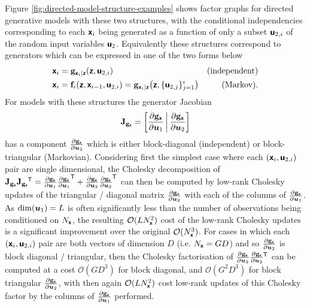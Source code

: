Figure \ref{fig:directed-model-structure-examples} shows factor graphs for directed generative models with these two structures, with the conditional independencies corresponding to each $\boldsymbol{\mathsf{x}}_i$ being generated as a function of only a subset $\boldsymbol{\mathsf{u}}_{2,i}$ of the random input variables $\boldsymbol{\mathsf{u}}_2$. Equivalently these structures correspond to generators which can be expressed in one of the two forms below
\begin{align}\label{eq:elem_autoreg_model_struct}
    \rvct{x}_i &= \genfunc_{\rvct{x}_i|\rvct{z}}(\rvct{z}, \rvct{u}_{2,i})
    & \text{(independent)}\\
    \rvct{x}_{i} 
    &=
    \vctfunc{f}_i\lpa\rvct{z}, \rvct{x}_{i-1}, \rvct{u}_{2,i}\rpa = 
    \genfunc_{\rvct{x}_i|\rvct{z}}\lpa\rvct{z}, \lbrace\rvct{u}_{2,j}\rbrace^i_{j=1}\rpa & \text{(Markov).}
\end{align}
For models with these structures the generator Jacobian
\begin{equation}
  \jacobian{\genfunc_{\rvct{x}}} =
  \lsb
   \pd{\genfunc_{\rvct{x}}}{\vct{u}_1} \,\middle|\,
   \pd{\genfunc_{\rvct{x}}}{\vct{u}_2}
  \rsb
\end{equation}
has a component $\frac{\partial {\mathbf{g}}_{\boldsymbol{\mathsf{x}}}}{\partial \boldsymbol{u}_2}$ which is either block-diagonal (independent) or block-triangular (Markovian). Considering first the simplest case where each $(\boldsymbol{\mathsf{x}}_i,\boldsymbol{\mathsf{u}}_{2,i})$ pair are single dimensional, the Cholesky decomposition of $\mathbf{J}_{{\mathbf{g}}_{\boldsymbol{\mathsf{x}}}}\mathbf{J}_{{\mathbf{g}}_{\boldsymbol{\mathsf{x}}}}\phantom{}^{\mkern-1.5mu\mathsf{T}} = \frac{\partial {\mathbf{g}}_{\boldsymbol{\mathsf{x}}}}{\partial \boldsymbol{u}_1}\frac{\partial {\mathbf{g}}_{\boldsymbol{\mathsf{x}}}}{\partial \boldsymbol{u}_1}^{\mkern-1.5mu\mathsf{T}} + \frac{\partial {\mathbf{g}}_{\boldsymbol{\mathsf{x}}}}{\partial \boldsymbol{u}_2} \frac{\partial {\mathbf{g}}_{\boldsymbol{\mathsf{x}}}}{\partial \boldsymbol{u}_2}^{\mkern-1.5mu\mathsf{T}}$ can then be computed by low-rank Cholesky updates of the triangular / diagonal matrix $\frac{\partial {\mathbf{g}}_{\boldsymbol{\mathsf{x}}}}{\partial \boldsymbol{u}_2}$ with each of the columns of $\frac{\partial {\mathbf{g}}_{\boldsymbol{\mathsf{x}}}}{\partial \boldsymbol{u}_1}$. As $\dim(\boldsymbol{u}_1) = L$ is often significantly less than the number of observations being conditioned on $N_{\boldsymbol{\mathsf{x}}}$, the resulting $\mathcal{O}(LN_{\boldsymbol{\mathsf{x}}}^2)$ cost of the low-rank Cholesky updates is a significant improvement over the original $\mathcal{O}(N_{\boldsymbol{\mathsf{x}}}^3)$. For cases in which each $(\boldsymbol{\mathsf{x}}_i,\boldsymbol{\mathsf{u}}_{2,i})$ pair are both vectors of dimension $D$ (i.e. $N_{\boldsymbol{\mathsf{x}}} = GD$) and so $\frac{\partial {\mathbf{g}}_{\boldsymbol{\mathsf{x}}}}{\partial \boldsymbol{u}_2}$ is block diagonal / triangular, then the Cholesky factorisation of  $\frac{\partial {\mathbf{g}}_{\boldsymbol{\mathsf{x}}}}{\partial \boldsymbol{u}_2} \frac{\partial {\mathbf{g}}_{\boldsymbol{\mathsf{x}}}}{\partial \boldsymbol{u}_2}\phantom{}^{\mkern-1.5mu\mathsf{T}}$ can be computed at a cost $\mathcal{O}(G D^3)$ for block diagonal, and $\mathcal{O}(G^2 D^3)$ for block triangular $\frac{\partial {\mathbf{g}}_{\boldsymbol{\mathsf{x}}}}{\partial \boldsymbol{u}_2}$, with then again $\mathcal{O}(LN_{\boldsymbol{\mathsf{x}}}^2)$ cost low-rank updates of this Cholesky factor by the columns of $\frac{\partial {\mathbf{g}}_{\boldsymbol{\mathsf{x}}}}{\partial \boldsymbol{u}_1}$ performed. 

